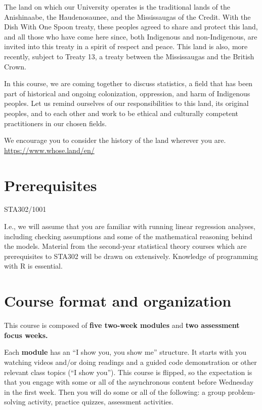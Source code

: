 \documentclass[
  openany]{book}
\begin{document}
The land on which our University operates is the traditional lands of the Anishinaabe, the Haudenosaunee, and the Mississaugas of the Credit. With the Dish With One Spoon treaty, these peoples agreed to share and protect this land, and all those who have come here since, both Indigenous and non-Indigenous, are invited into this treaty in a spirit of respect and peace. This land is also, more recently, subject to Treaty 13, a treaty between the Mississaugas and the British Crown.

In this course, we are coming together to discuss statistics, a field that has been part of historical and ongoing colonization, oppression, and harm of Indigenous peoples. Let us remind ourselves of our responsibilities to this land, its original peoples, and to each other and work to be ethical and culturally competent practitioners in our chosen fields.

We encourage you to consider the history of the land wherever you are. \url{https://www.whose.land/en/}

\hypertarget{prerequisites}{%
\section{Prerequisites}\label{prerequisites}}

STA302/1001

I.e., we will assume that you are familiar with running linear regression analyses, including checking assumptions and some of the mathematical reasoning behind the models. Material from the second-year statistical theory courses which are prerequisites to STA302 will be drawn on extensively. Knowledge of programming with R is essential.

\hypertarget{course-format-and-organization}{%
\section{Course format and organization}\label{course-format-and-organization}}

This course is composed of \textbf{five two-week modules} and \textbf{two assessment focus weeks.}

Each \textbf{module} has an ``I show you, you show me'' structure. It starts with you watching videos and/or doing readings and a guided code demonstration or other relevant class topics (``I show you''). This course is flipped, so the expectation is that you engage with some or all of the asynchronous content before Wednesday in the first week. Then you will do some or all of the following: a group problem-solving activity, practice quizzes, assessment activities.
\end{document}
